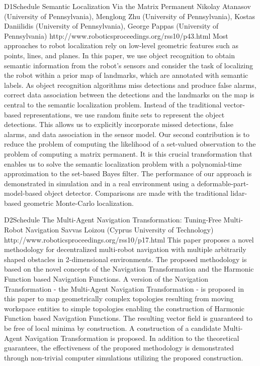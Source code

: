 \begin{spacing}{1.0}
\descriptionPaper
{D1}{Schedule}
{	
Semantic Localization Via the Matrix Permanent 
}
{
Nikolay Atanasov (University of Pennsylvania), Menglong Zhu (University of Pennsylvania), Kostas Daniilidis (University of Pennsylvania), George Pappas (University of Pennsylvania)
}
{
http://www.roboticsproceedings.org/rss10/p43.html
}
{
Most approaches to robot localization rely on low-level geometric features such as points, lines, and planes. In this paper, we use object recognition to obtain semantic information from the robot's sensors and consider the task of localizing the robot within a prior map of landmarks, which are annotated with semantic labels. As object recognition algorithms miss detections and produce false alarms, correct data association between the detections and the landmarks on the map is central to the semantic localization problem. Instead of the traditional vector-based representations, we use random finite sets to represent the object detections. This allows us to explicitly incorporate missed detections, false alarms, and data association in the sensor model. Our second contribution is to reduce the problem of computing the likelihood of a set-valued observation to the problem of computing a matrix permanent. It is this crucial transformation that enables us to solve the semantic localization problem with a polynomial-time approximation to the set-based Bayes filter. The performance of our approach is demonstrated in simulation and in a real environment using a deformable-part-model-based object detector. Comparisons are made with the traditional lidar-based geometric Monte-Carlo localization.
}




\descriptionPaper
{D2}{Schedule}
{	
The Multi-Agent Navigation Transformation: Tuning-Free Multi-Robot Navigation
}
{
Savvas Loizou (Cyprus University of Technology)
}
{
http://www.roboticsproceedings.org/rss10/p17.html
}
{
This paper proposes a novel methodology for decentralized multi-robot navigation with multiple arbitrarily shaped obstacles in 2-dimensional environments. The proposed methodology is based on the novel concepts of the Navigation Transformation and the Harmonic Function based Navigation Functions. A version of the Navigation Transformation - the Multi-Agent Navigation Transformation - is proposed in this paper to map geometrically complex topologies resulting from moving workspace entities to simple topologies enabling the construction of Harmonic Function based Navigation Functions. The resulting vector field is guaranteed to be free of local minima by construction. A construction of a candidate Multi-Agent Navigation Transformation is proposed. In addition to the theoretical guarantees, the effectiveness of the proposed methodology is demonstrated through non-trivial computer simulations utilizing the proposed construction.
}



\end{spacing}
